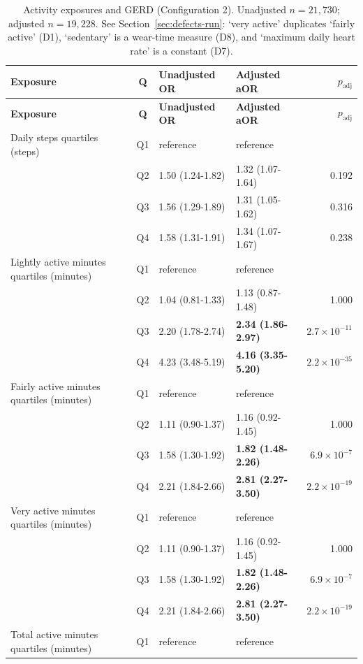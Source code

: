 \documentclass[11pt]{article}
\begin{document}
\begin{longtable}{@{}p{5.2cm}c p{3.0cm} p{3.0cm} r@{}}
\caption{Activity exposures and GERD (Configuration 2). Unadjusted $n=21{,}730$; adjusted $n=19{,}228$. See Section~\ref{sec:defects-run}: `very active' duplicates `fairly active' (D1), `sedentary' is a wear-time measure (D8), and `maximum daily heart rate' is a constant (D7).}\label{tab:res-act-gerd}\\
\toprule \textbf{Exposure} & \textbf{Q} & \textbf{Unadjusted OR} & \textbf{Adjusted aOR} & \textbf{$p_{\text{adj}}$} \\ \midrule
\endfirsthead \toprule \textbf{Exposure} & \textbf{Q} & \textbf{Unadjusted OR} & \textbf{Adjusted aOR} & \textbf{$p_{\text{adj}}$} \\ \midrule \endhead
Daily steps quartiles (steps) & Q1 & reference & reference & \\
 & Q2 & 1.50 (1.24-1.82) & 1.32 (1.07-1.64) & 0.192 \\
 & Q3 & 1.56 (1.29-1.89) & 1.31 (1.05-1.62) & 0.316 \\
 & Q4 & 1.58 (1.31-1.91) & 1.34 (1.07-1.67) & 0.238 \\
\addlinespace
Lightly active minutes quartiles (minutes) & Q1 & reference & reference & \\
 & Q2 & 1.04 (0.81-1.33) & 1.13 (0.87-1.48) & 1.000 \\
 & Q3 & 2.20 (1.78-2.74) & \textbf{2.34 (1.86-2.97)} & $2.7\times10^{-11}$ \\
 & Q4 & 4.23 (3.48-5.19) & \textbf{4.16 (3.35-5.20)} & $2.2\times10^{-35}$ \\
\addlinespace
Fairly active minutes quartiles (minutes) & Q1 & reference & reference & \\
 & Q2 & 1.11 (0.90-1.37) & 1.16 (0.92-1.45) & 1.000 \\
 & Q3 & 1.58 (1.30-1.92) & \textbf{1.82 (1.48-2.26)} & $6.9\times10^{-7}$ \\
 & Q4 & 2.21 (1.84-2.66) & \textbf{2.81 (2.27-3.50)} & $2.2\times10^{-19}$ \\
\addlinespace
Very active minutes quartiles (minutes) & Q1 & reference & reference & \\
 & Q2 & 1.11 (0.90-1.37) & 1.16 (0.92-1.45) & 1.000 \\
 & Q3 & 1.58 (1.30-1.92) & \textbf{1.82 (1.48-2.26)} & $6.9\times10^{-7}$ \\
 & Q4 & 2.21 (1.84-2.66) & \textbf{2.81 (2.27-3.50)} & $2.2\times10^{-19}$ \\
\addlinespace
Total active minutes quartiles (minutes) & Q1 & reference & reference & \\

\end{longtable}
\end{document}
